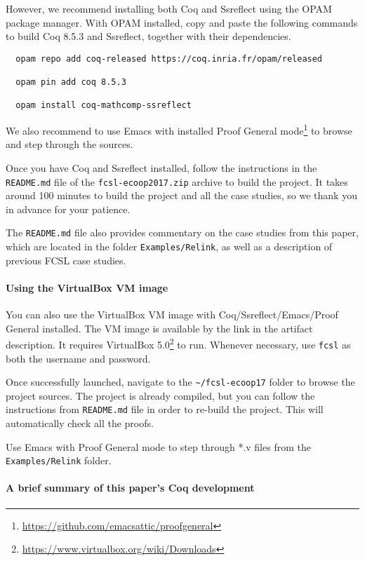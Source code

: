 \documentclass[a4paper,USenglish]{lipics-v2016}
\begin{document}
However, we recommend installing both Coq and Ssreflect using the
OPAM package manager. With OPAM installed, copy and paste the
following commands to build Coq 8.5.3 and Ssreflect, together with
their dependencies.

\begin{verbatim}
  opam repo add coq-released https://coq.inria.fr/opam/released

  opam pin add coq 8.5.3

  opam install coq-mathcomp-ssreflect
\end{verbatim}

We also recommend to use Emacs with installed Proof General
mode\footnote{\url{https://github.com/emacsattic/proofgeneral}} to
browse and step through the sources.

Once you have Coq and Ssreflect installed, follow the instructions in
the \texttt{README.md} file of the \texttt{fcsl-ecoop2017.zip} archive
to build the project. It takes around 100 minutes to build the project
and all the case studies, so we thank you in advance for your
patience.

The \texttt{README.md} file also provides commentary on the case
studies from this paper, which are located in the folder
\texttt{Examples/Relink}, as well as a description of previous FCSL
case studies.

\paragraph*{Using the VirtualBox VM image}
%
You can also use the VirtualBox VM image with
Coq/Ssreflect/Emacs/Proof General installed. The VM image is available
by the link in the artifact description. It requires VirtualBox
5.0\footnote{\url{https://www.virtualbox.org/wiki/Downloads}} to
run. Whenever necessary, use \texttt{fcsl} as both the username and
password.

Once successfully launched, navigate to the
\texttt{\textasciitilde/fcsl-ecoop17} folder to browse the project
sources. The project is already compiled, but you can follow the
instructions from \texttt{README.md} file in order to re-build the
project. This will automatically check all the proofs.

Use Emacs with Proof General mode to step through *.v files from the
\texttt{Examples/Relink} folder.

\paragraph*{A brief summary of this paper's Coq development}
\end{document}

